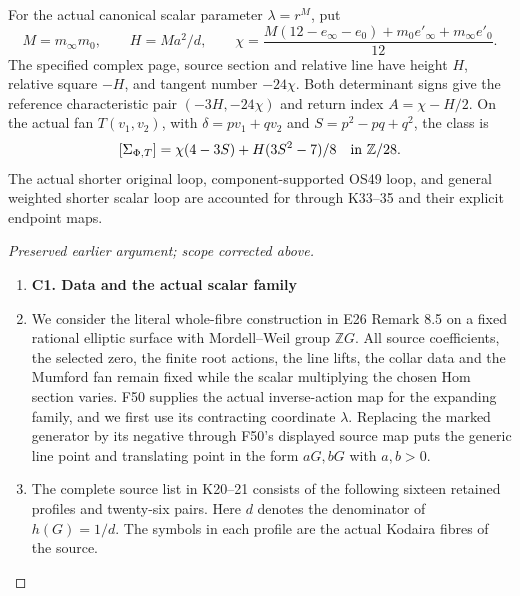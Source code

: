 \begin{theorem}
For the actual canonical scalar parameter \(\lambda=r^M\), put
\[
 M=m_\infty m_0,\qquad H=Ma^2/d,\qquad
 \chi=\frac{M(12-e_\infty-e_0)+m_0e'_\infty+m_\infty e'_0}{12}.
\]
The specified complex page, source section and relative line have
height \(H\), relative square \(-H\), and tangent number
\(-24\chi\). Both determinant signs give the reference characteristic
pair \((-3H,-24\chi)\) and return index \(A=\chi-H/2\).
On the actual fan \(T(v_1,v_2)\), with
\(\delta=pv_1+qv_2\) and \(S=p^2-pq+q^2\), the class is
\[
 [\Sigma_{\Phi,T}]
       =\chi(4-3S)+H(3S^2-7)/8\quad\hbox{in }\mathbb Z/28.
\]
The actual shorter original loop, component-supported OS49 loop,
and general weighted shorter scalar loop are accounted for through
K33--35 and their explicit endpoint maps.
\end{theorem}
\begin{proof}[Preserved earlier argument; scope corrected above]
\begin{enumerate}[label=\arabic*.]
\item \par

\medskip\noindent\textbf{C1. Data and the actual scalar family}

\par\nobreak

\item We consider the literal whole-fibre construction in E26 Remark 8.5
on a fixed rational elliptic surface with Mordell--Weil group
\(\mathbb ZG\). All source coefficients, the selected zero, the
finite root actions, the line lifts, the collar data and the
Mumford fan remain fixed while the scalar multiplying the chosen
Hom section varies. F50 supplies the actual inverse-action map
for the expanding family, and we first use its contracting
coordinate \(\lambda\). Replacing the marked generator by its
negative through F50's displayed source map puts the generic
line point and translating point in the form \(aG,bG\) with
\(a,b>0\).

\item The complete source list in K20--21 consists of the following
sixteen retained profiles and twenty-six pairs. Here \(d\)
denotes the denominator of \(h(G)=1/d\). The symbols in each
profile are the actual Kodaira fibres of the source.


\end{enumerate}
\end{proof}
